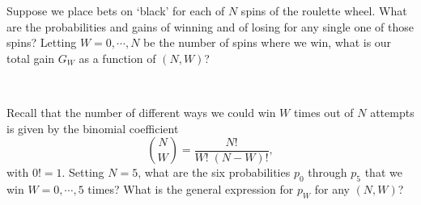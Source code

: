 Suppose we place  bets on `black' for each of $N$ spins of the roulette wheel.
What are the probabilities and gains of winning and of losing for any single one of those spins?
Letting $W = 0, \cdots, N$ be the number of spins where we win, what is our total gain $G_W$ as a function of $(N, W)$?
\begin{mdframed}
  \ \\[100 pt]
\end{mdframed}
Recall that the number of different ways we could win $W$ times out of $N$ attempts is given by the binomial coefficient
\begin{equation*}
  \binom{N}{W} = \frac{N!}{W! \; (N - W)!},
\end{equation*}
with $0! = 1$.
Setting $N = 5$, what are the six probabilities $p_0$ through $p_5$ that we win $W = 0, \cdots, 5$ times?
What is the general expression for $p_W$ for any $(N, W)$?
\begin{mdframed}
  \ \\[100 pt]
\end{mdframed}

